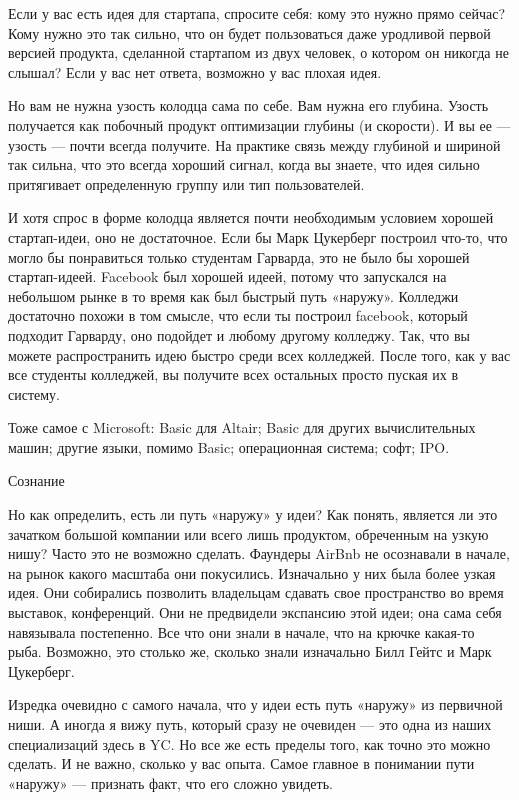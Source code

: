\documentclass[ebook,12pt,oneside,openany]{memoir}
\begin{document}
Если у вас есть идея для стартапа, спросите себя: кому это нужно прямо
сейчас? Кому нужно это так сильно, что он будет пользоваться даже
уродливой первой версией продукта, сделанной стартапом из двух
человек, о котором он никогда не слышал? Если у вас нет ответа,
возможно у вас плохая идея.

Но вам не нужна узость колодца сама по себе. Вам нужна его глубина.
Узость получается как побочный продукт оптимизации глубины (и
скорости). И вы ее — узость — почти всегда получите. На практике связь
между глубиной и шириной так сильна, что это всегда хороший сигнал,
когда вы знаете, что идея сильно притягивает определенную группу или
тип пользователей.

И хотя спрос в форме колодца является почти необходимым условием
хорошей стартап-идеи, оно не достаточное. Если бы Марк Цукерберг
построил что-то, что могло бы понравиться только студентам Гарварда,
это не было бы хорошей стартап-идеей. Facebook был хорошей идеей,
потому что запускался на небольшом рынке в то время как был быстрый
путь «наружу». Колледжи достаточно похожи в том смысле, что если ты
построил facebook, который подходит Гарварду, оно подойдет и любому
другому колледжу. Так, что вы можете распространить идею быстро среди
всех колледжей. После того, как у вас все студенты колледжей, вы
получите всех остальных просто пуская их в систему.

Тоже самое с Microsoft: Basic для Altair; Basic для других
вычислительных машин; другие языки, помимо Basic; операционная
система; софт; IPO.

Сознание

Но как определить, есть ли путь «наружу» у идеи? Как понять, является
ли это зачатком большой компании или всего лишь продуктом, обреченным
на узкую нишу? Часто это не возможно сделать. Фаундеры AirBnb не
осознавали в начале, на рынок какого масштаба они покусились.
Изначально у них была более узкая идея. Они собирались позволить
владельцам сдавать свое пространство во время выставок, конференций.
Они не предвидели экспансию этой идеи; она сама себя навязывала
постепенно. Все что они знали в начале, что на крючке какая-то рыба.
Возможно, это столько же, сколько знали изначально Билл Гейтс и Марк
Цукерберг.

Изредка очевидно с самого начала, что у идеи есть путь «наружу» из
первичной ниши. А иногда я вижу путь, который сразу не очевиден — это
одна из наших специализаций здесь в YC. Но все же есть пределы того,
как точно это можно сделать. И не важно, сколько у вас опыта. Самое
главное в понимании пути «наружу» — признать факт, что его сложно
увидеть.
\end{document}

